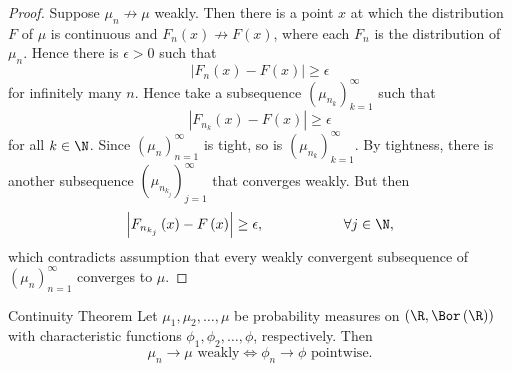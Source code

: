 \documentclass[stat901]{subfiles}
\begin{document}
    \begin{proof}
        Suppose $\mu_n\not\to\mu$ weakly. Then there is a point $x$ at which the distribution $F$ of $\mu$ is continuous and $F_n\left( x \right)\not\to F\left( x \right)$, where each $F_n$ is the distribution of $\mu_n$. Hence there is $\epsilon>0$ such that
        \begin{equation*}
            \left| F_n\left( x \right)-F\left( x \right) \right|\geq\epsilon
        \end{equation*}
        for infinitely many $n$. Hence take a subsequence $\left( \mu_{n_k} \right)^{\infty}_{k=1}$ such that
        \begin{equation*}
            \left| F_{n_k}\left( x \right)-F\left( x \right) \right| \geq \epsilon
        \end{equation*}
        for all $k\in\N$. Since $\left( \mu_{n} \right)^{\infty}_{n=1}$ is tight, so is $\left( \mu_{n_k} \right)^{\infty}_{k=1}$. By tightness, there is another subsequence $\left( \mu_{n_{k_j}} \right)^{\infty}_{j=1}$ that converges weakly. But then
        \begin{equation*}
            \left| F_{n_{k_j}}\left( x \right)-F\left( x \right) \right|\geq\epsilon, \hspace{2cm}\forall j\in\N,
        \end{equation*}
        which contradicts assumption that every weakly convergent subsequence of $\left( \mu_{n} \right)^{\infty}_{n=1}$ converges to $\mu$.
    \end{proof}

    \begin{theorem}{Continuity Theorem}
        Let $\mu_1,\mu_2,\ldots,\mu$ be probability measures on $\left( \R,\Bor\left( \R \right) \right)$ with characteristic functions $\phi_1,\phi_2,\ldots,\phi$, respectively. Then
        \begin{equation*}
            \mu_n\to\mu\text{ weakly} \iff \phi_n\to\phi\text{ pointwise}.
        \end{equation*}
    \end{theorem}
\end{document}
